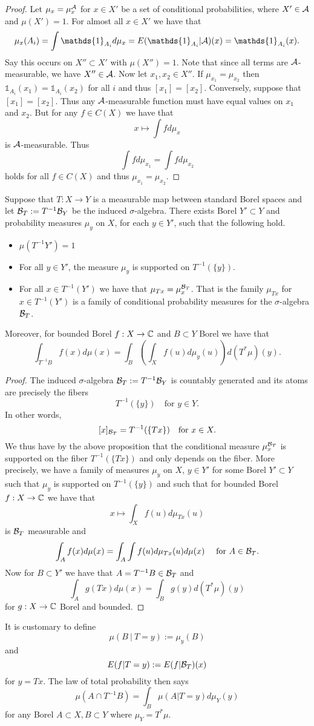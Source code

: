 \documentclass[twoside, a4paper, 10pt]{amsart}
\begin{document}
\begin{proof} Let $\mu_x = \mu_x^{\mathcal{A}}$ for $x \in X'$ be a set of conditional probabilities, where $X' \in \mathcal{A}$ and $\mu(X')=1$. For almost all $x \in X'$ we have that $$\mu_x(A_i) = \int \mathds{1}_{A_i} d\mu_x = E(\mathds{1}_{A_i}|\cA)(x) = \mathds{1}_{A_i}(x).$$ Say this occurs on $X'' \subset X'$ with $\mu(X'')=1$. Note that since all terms are $\mathcal{A}$-measurable, we have $X'' \in \mathcal{A}$. Now let $x_1,x_2 \in X''$. If $\mu_{x_1} = \mu_{x_2}$ then $\mathds{1}_{A_i}(x_1) = \mathds{1}_{A_i}(x_2)$ for all $i$ and thus $[x_1] = [x_2]$. Conversely, suppose that $[x_1]=[x_2]$. Thus any $\mathcal{A}$-measurable function must have equal values on $x_1$ and $x_2$. But for any $f \in C(X)$ we have that $$x \mapsto \int f d\mu_x$$ is $\mathcal{A}$-measurable. Thus $$\int f d\mu_{x_1} = \int f d \mu_{x_2}$$ holds for all $f \in C(X)$ and thus $\mu_{x_1} = \mu_{x_2}$. \end{proof}

\begin{thm} Suppose that $T:X\to Y$ is a measurable map between standard Borel spaces and let $\mathcal{B}_T := T^{-1}\mathcal{B}_Y$ be the induced $\sigma$-algebra. There exists Borel $Y' \subset Y$ and probability measures $\mu_y$ on $X$, for each $y \in Y'$, such that the following hold.

\begin{itemize}
	\item $\mu(T^{-1}Y') = 1$
	\item For all $y \in Y'$, the measure $\mu_y$ is supported on $T^{-1}(\{y \})$.
	\item For all $x \in T^{-1}(Y')$ we have that $\mu_{Tx} = \mu_{x}^{\mathcal{B}_T}$. That is the family $\mu_{Tx}$ for $x \in T^{-1}(Y')$ is a family of conditional probability measures for the $\sigma$-algebra $\mathcal{B}_T$.
\end{itemize}

Moreover, for bounded Borel $f: X \to \mathbb{C}$ and $B \subset Y$ Borel we have that $$\int_{T^{-1}B} f(x) d\mu(x) = \int_{B} \left( \int_X f(u) d\mu_y(u) \right) d(T^*\mu)(y).$$

\end{thm}

\begin{proof} The induced $\sigma$-algebra $\mathcal{B}_T := T^{-1}\mathcal{B}_Y$ is countably generated and its atoms are precisely the fibers $$T^{-1}(\{y\}) \quad \text{for } y \in Y.$$ In other words, $$[x]_{\mathcal{B}_T} = T^{-1}(\{ Tx \}) \quad \text{for } x \in X.$$ We thus have by the above proposition that the conditional measure $\mu_{x}^{\mathcal{B}_T}$ is supported on the fiber $T^{-1}(\{Tx\})$ and only depends on the fiber. More precisely, we have a family of measures $\mu_y$ on $X$, $y \in Y'$ for some Borel $Y' \subset Y$ such that $\mu_y$ is supported on $T^{-1}(\{y \})$ and such that for bounded Borel $f:X \to \mathbb{C}$ we have that $$x \mapsto \int_X f(u) d\mu_{Tx}(u)$$ is $\mathcal{B}_T$ measurable and $$\int_A f(x) d\mu(x) = \int_A \int f(u) d\mu_{Tx}(u) d\mu(x) \quad \text{ for } A \in \mathcal{B}_T.$$ Now for $B \subset Y'$ we have that $A= T^{-1}B \in \mathcal{B}_T$ and $$\int_A g(Tx) d\mu(x) = \int_B g(y) d (T^*\mu)(y)$$ for $g:X \to \mathbb{C}$ Borel and bounded. \end{proof}

It is customary to define $$\mu(B ~|~ T = y) := \mu_y(B)$$ and $$E(f | T=y) := E(f|\mathcal{B}_T)(x)$$ for $y = Tx$. The law of total probability then says $$\mu(A \cap T^{-1}B) = \int_B \mu(A | T=y) d\mu_Y(y)  $$ for any Borel $A \subset X, B \subset Y$ where $\mu_Y = T^*\mu$.
\end{document}
